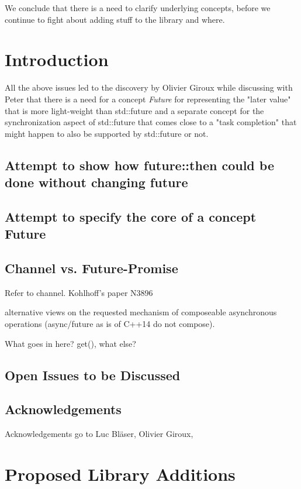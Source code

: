 \documentclass[ebook,11pt,article]{memoir}
\begin{document}
We conclude that there is a need to clarify underlying concepts, before we continue to fight about adding stuff to the library and where. 



\chapter{Introduction}
All the above issues led to the discovery by Olivier Giroux while discussing with Peter that there is a need for a concept \emph{Future} for representing the "later value" that is more light-weight than std::future and a separate concept for the synchronization aspect of std::future that comes close to a "task completion" that might happen to also be supported by std::future or not.

\section{Attempt to show how future::then could be done without changing future}

\section{Attempt to specify the core of a concept Future}

\section{Channel vs. Future-Promise}
Refer to channel. Kohlhoff's paper N3896

alternative views on the requested mechanism of composeable asynchronous operations (async/future as is of C++14 do not compose).


What goes in here? get(), what else?
\section{Open Issues to be Discussed}

\section{Acknowledgements}
Acknowledgements go to Luc Bläser, Olivier Giroux, 

\chapter{Proposed Library Additions}
%
%




\end{document}
